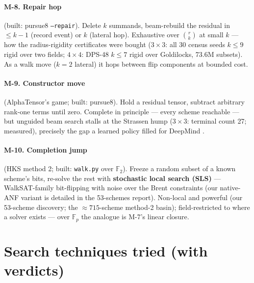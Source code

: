 \documentclass[10pt]{article}
\begin{document}
\paragraph{M-8. Repair hop} (built: pursue8 \texttt{--repair}).
Delete $k$ summands, beam-rebuild the residual in $\le k-1$ (record
event) or $k$ (lateral hop). Exhaustive over $\binom{r}{k}$ at
small $k$ --- how the radius-rigidity certificates were bought
($3{\times}3$: all 30 census seeds $k \le 9$ rigid over two fields;
$4{\times}4$: DPS-48 $k \le 7$ rigid over Goldilocks, 73.6M
subsets). As a walk move ($k=2$ lateral) it hops between flip
components at bounded cost.

\paragraph{M-9. Constructor move} (AlphaTensor's game; built:
pursue8). Hold a residual tensor, subtract arbitrary rank-one
terms until zero. Complete in principle --- every scheme reachable
--- but unguided beam search stalls at the Strassen hump
($3{\times}3$: terminal count 27; measured), precisely the gap a
learned policy filled for DeepMind \cite{alphatensor}.

\paragraph{M-10. Completion jump} (HKS method 2; built:
\texttt{walk.py} over $\mathbb{F}_2$). Freeze a random subset of a
known scheme's bits, re-solve the rest with \textbf{stochastic
local search (SLS)} --- WalkSAT-family bit-flipping with noise over
the Brent constraints (our native-ANF variant is detailed in the
53-schemes report). Non-local and
powerful (our 53-scheme discovery; the ${\approx}715$-scheme
method-2 basin); field-restricted to where a solver exists ---
over $\mathbb{F}_p$ the analogue is M-7's linear closure.

\section{Search techniques tried (with verdicts)}
\end{document}
